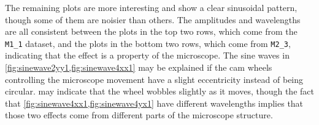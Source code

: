 \documentclass{article}
\newcommand{\M}[2]{\texttt{M#1\_#2}}
\begin{document}
The remaining plots are more interesting and show a clear sinusoidal pattern, though some of them are noisier than others.  The amplitudes and wavelengths are all consistent between the plots in the top two rows, which come from the \M11 dataset, and the plots in the bottom two rows, which come from \M23, indicating that the effect is a property of the microscope.  The sine waves in \cref{fig:sinewave2yy1,fig:sinewave4xx1} may be explained if the cam wheels controlling the microscope movement have a slight eccentricity instead of being circular.   may indicate that the wheel wobbles slightly as it moves, though the fact that \cref{fig:sinewave4xx1,fig:sinewave4yx1} have different wavelengths implies that those two effects come from different parts of the microscope structure.
\end{document}
